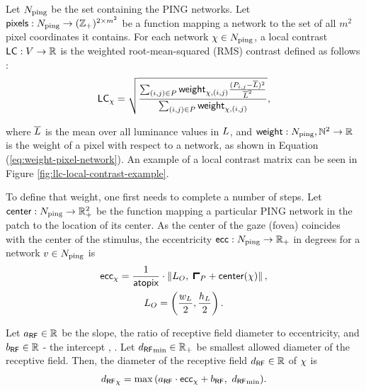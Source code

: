 Let $N_{\mathrm{ping}}$ be the set containing the PING networks. Let $\mathsf{pixels}: N_{\mathrm{ping}} \to (\mathbb{Z}_+)^{2 \times m^2}$ be a function mapping a network to the set of all $m^2$ pixel coordinates it contains.
For each network $\chi \in N_{\mathrm{ping}}$, a local contrast $\mathsf{LC}: V \to \mathbb{R}$ is the weighted root-mean-squared (RMS) contrast defined as follows \cite{Frazor2006}:
\begin{equation}
    \mathsf{LC}_\chi = \sqrt{
        \frac{
            \sum_{(i, j) \in P} \mathsf{weight}_{\chi, (i, j)} \frac{(P_{i, j} - \overline{L})^2}{\overline{L}^2}
        }{
            \sum_{(i, j) \in P} \mathsf{weight}_{\chi, (i, j)}
        }
    },
\end{equation}

where $\overline{L}$ is the mean over all luminance values in $L$, and $\mathsf{weight}: N_{\mathrm{ping}}, \mathbb{N}^2 \to \mathbb{R}$ is the weight of a pixel with respect to a network, as shown in Equation (\ref{eq:weight-pixel-network}). An example of a local contrast matrix can be seen in Figure \ref{fig:llc-local-contrast-example}.

To define that weight, one first needs to complete a number of steps.
Let $\mathsf{center} : N_{\mathrm{ping}} \to \mathbb{R}_+^2$ be the function mapping a particular PING network in the patch to the location of its center. As the center of the gaze (fovea) coincides with the center of the stimulus, the eccentricity $\mathsf{ecc}: N_{\mathrm{ping}} \to \mathbb{R}_+$ in degrees for a network $v \in N_{\mathrm{ping}}$ is
\begin{equation}
\begin{gathered}
    \ecc_{\pingnet} = \frac{1}{\atopix} \cdot \left\| \stimcenter, \ \patchstart + \centr(\pingnet) \right\|, \\
    \stimcenter = \left( \frac{\fullwidth}{2}, \frac{\fullheight}{2}   \right).
\end{gathered}
\end{equation}

Let $a_\mathsf{RF} \in \mathbb{R}$ be the slope, the ratio of receptive field diameter to eccentricity, and $b_\mathsf{RF} \in \mathbb{R}$ - the intercept \cite{MaryamPLACEHOLDER}, \cite{Freeman2011}.
Let ${d_\mathsf{RF}}_{\min} \in \mathbb{R}_+$ be smallest allowed diameter of the receptive field.
Then, the diameter of the receptive field ${d_\mathsf{RF}} \in \mathbb{R}$ of $\chi$ is 
\begin{equation}
    {d_\mathsf{RF}}_\chi = \max{( a_\mathsf{RF}\cdot \mathsf{ecc}_\chi+ b_\mathsf{RF}, \ {d_\mathsf{RF}}_{\min} )}.
\end{equation}

